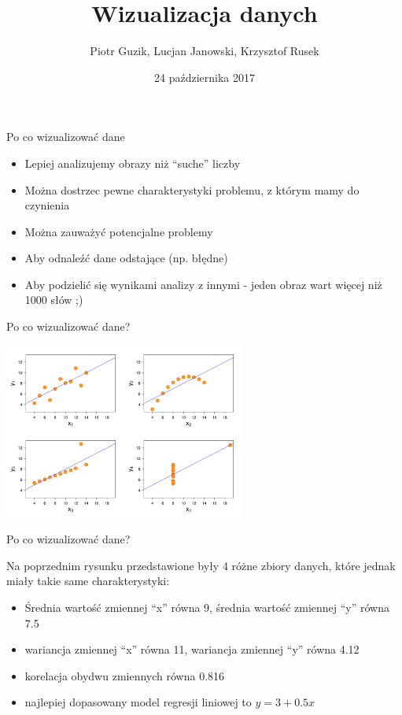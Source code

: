\documentclass[ignorenonframetext,]{beamer}
\title{Wizualizacja danych}
\author{Piotr Guzik, Lucjan Janowski, Krzysztof Rusek}
\date{24 października 2017}
\providecommand{\tightlist}{%
\setlength{\itemsep}{0pt}\setlength{\parskip}{0pt}}
\begin{document}
\frame{\titlepage}

\begin{frame}{Po co wizualizować dane}

\begin{itemize}
\tightlist
\item
  Lepiej analizujemy obrazy niż ``suche'' liczby
\item
  Można dostrzec pewne charakterystyki problemu, z którym mamy do
  czynienia
\item
  Można zauważyć potencjalne problemy
\item
  Aby odnaleźć dane odstające (np. błędne)
\item
  Aby podzielić się wynikami analizy z innymi - jeden obraz wart więcej
  niż 1000 słów ;)
\end{itemize}

\end{frame}

\begin{frame}{Po co wizualizować dane?}

\begin{center}\includegraphics[width=300px]{images/kwartet} \end{center}

\end{frame}

\begin{frame}{Po co wizualizować dane?}

Na poprzednim rysunku przedstawione były 4 różne zbiory danych, które
jednak miały takie same charakterystyki:

\begin{itemize}
\tightlist
\item
  Średnia wartość zmiennej ``x'' równa 9, średnia wartość zmiennej ``y''
  równa 7.5
\item
  wariancja zmiennej ``x'' równa 11, wariancja zmiennej ``y'' równa 4.12
\item
  korelacja obydwu zmiennych równa 0.816
\item
  najlepiej dopasowany model regresji liniowej to \(y=3+0.5x\)
\end{itemize}

\end{frame}
\end{document}
